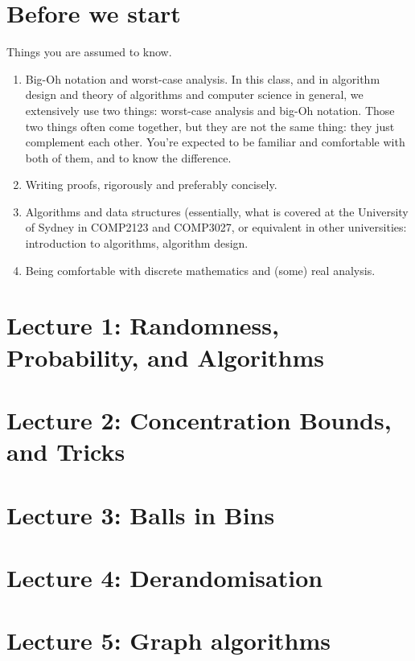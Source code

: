 \documentclass[a4paper]{tufte-book}
\begin{document}
\tableofcontents

\listoffigures

\listoftables
\mainmatter

\chapter*{Before we start}
Things you are assumed to know.
\begin{enumerate}
    \item Big-Oh notation and worst-case analysis. In this class, and in algorithm design and theory of algorithms and computer science in general,
we extensively use two things: worst-case analysis and big-Oh notation. Those two things often come together, but they are not the same thing: they just
complement each other. You're expected to be familiar and comfortable with both of them, and to know the difference.
    \item Writing proofs, rigorously and preferably concisely.
    \item Algorithms and data structures (essentially, what is covered at the University of Sydney in COMP2123 and COMP3027, or equivalent in other universities: introduction to algorithms, algorithm design.
    \item Being comfortable with discrete mathematics and (some) real analysis.
\end{enumerate}

\chapter{Lecture 1: Randomness, Probability, and Algorithms}


\chapter{Lecture 2: Concentration Bounds, and Tricks}\label{chap:2}


\chapter{Lecture 3: Balls in Bins}


\chapter{Lecture 4: Derandomisation}


\chapter{Lecture 5: Graph algorithms}

\end{document}
